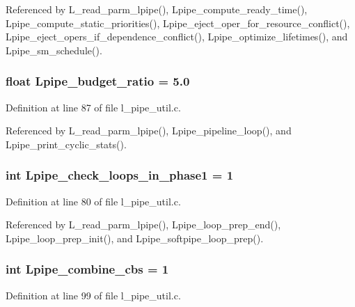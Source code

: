 Referenced by L\_\-read\_\-parm\_\-lpipe(), Lpipe\_\-compute\_\-ready\_\-time(), Lpipe\_\-compute\_\-static\_\-priorities(), Lpipe\_\-eject\_\-oper\_\-for\_\-resource\_\-conflict(), Lpipe\_\-eject\_\-opers\_\-if\_\-dependence\_\-conflict(), Lpipe\_\-optimize\_\-lifetimes(), and Lpipe\_\-sm\_\-schedule().
\subsubsection{\setlength{\rightskip}{0pt plus 5cm}float \bf{Lpipe\_\-budget\_\-ratio} = 5.0}\label{l__pipe__util_8c_a50c2551f678955eabc6e79793268ffa}




Definition at line 87 of file l\_\-pipe\_\-util.c.

Referenced by L\_\-read\_\-parm\_\-lpipe(), Lpipe\_\-pipeline\_\-loop(), and Lpipe\_\-print\_\-cyclic\_\-stats().
\subsubsection{\setlength{\rightskip}{0pt plus 5cm}int \bf{Lpipe\_\-check\_\-loops\_\-in\_\-phase1} = 1}\label{l__pipe__util_8c_6535802484914fea24cb0c4267280e86}




Definition at line 80 of file l\_\-pipe\_\-util.c.

Referenced by L\_\-read\_\-parm\_\-lpipe(), Lpipe\_\-loop\_\-prep\_\-end(), Lpipe\_\-loop\_\-prep\_\-init(), and Lpipe\_\-softpipe\_\-loop\_\-prep().
\subsubsection{\setlength{\rightskip}{0pt plus 5cm}int \bf{Lpipe\_\-combine\_\-cbs} = 1}\label{l__pipe__util_8c_33aa768a71f08754b1273f95c0cf1d2f}




Definition at line 99 of file l\_\-pipe\_\-util.c.


